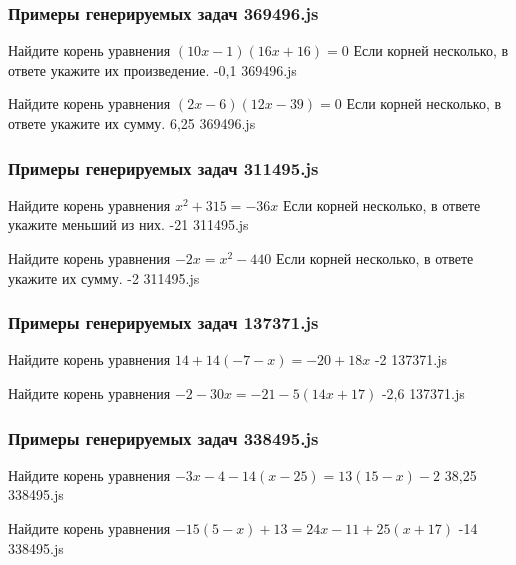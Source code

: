 
\subsubsection*{Примеры генерируемых задач 369496.js}   

\par{Найдите корень уравнения $(10x−1)(16x+16)=0$ Если корней несколько, в ответе укажите их произведение. }{ -0,1 }{369496.js}
\par{Найдите корень уравнения $(2x−6)(12x−39)=0$ Если корней несколько, в ответе укажите их сумму. }{ 6,25 }{369496.js}


\subsubsection*{Примеры генерируемых задач 311495.js}   

\par{Найдите корень уравнения $x^2+315=−36x$ Если корней несколько, в ответе укажите меньший из них. }{ -21 }{311495.js}
\par{Найдите корень уравнения $−2x=x^2−440$ Если корней несколько, в ответе укажите их сумму. }{ -2 }{311495.js}


\subsubsection*{Примеры генерируемых задач 137371.js}   

\par{Найдите корень уравнения $14+14(−7−x)=−20+18x$ }{ -2 }{137371.js}
\par{Найдите корень уравнения $−2−30x=−21−5(14x+17)$ }{ -2,6 }{137371.js}


\subsubsection*{Примеры генерируемых задач 338495.js}   

\par{Найдите корень уравнения $−3x−4−14(x−25)=13(15−x)−2$ }{ 38,25 }{338495.js}
\par{Найдите корень уравнения $−15(5−x)+13=24x−11+25(x+17)$ }{ -14 }{338495.js}

